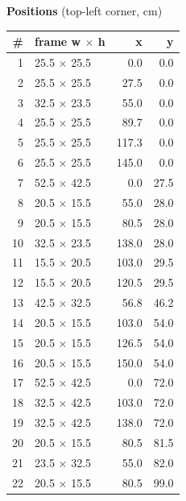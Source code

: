 \documentclass[a4paper,landscape,10pt]{article}
\begin{document}
\begin{minipage}[t]{0.25\textwidth}
\vspace{8pt}
{\bfseries Positions} (top-left corner, cm)\\[2pt]
\tiny
\begin{tabular}{@{}r l r r@{}}
\toprule
\# & frame w $\times$ h & x & y \\
\midrule
1 & 25.5 $\times$ 25.5 & 0.0 & 0.0 \\
2 & 25.5 $\times$ 25.5 & 27.5 & 0.0 \\
3 & 32.5 $\times$ 23.5 & 55.0 & 0.0 \\
4 & 25.5 $\times$ 25.5 & 89.7 & 0.0 \\
5 & 25.5 $\times$ 25.5 & 117.3 & 0.0 \\
6 & 25.5 $\times$ 25.5 & 145.0 & 0.0 \\
7 & 52.5 $\times$ 42.5 & 0.0 & 27.5 \\
8 & 20.5 $\times$ 15.5 & 55.0 & 28.0 \\
9 & 20.5 $\times$ 15.5 & 80.5 & 28.0 \\
10 & 32.5 $\times$ 23.5 & 138.0 & 28.0 \\
11 & 15.5 $\times$ 20.5 & 103.0 & 29.5 \\
12 & 15.5 $\times$ 20.5 & 120.5 & 29.5 \\
13 & 42.5 $\times$ 32.5 & 56.8 & 46.2 \\
14 & 20.5 $\times$ 15.5 & 103.0 & 54.0 \\
15 & 20.5 $\times$ 15.5 & 126.5 & 54.0 \\
16 & 20.5 $\times$ 15.5 & 150.0 & 54.0 \\
17 & 52.5 $\times$ 42.5 & 0.0 & 72.0 \\
18 & 32.5 $\times$ 42.5 & 103.0 & 72.0 \\
19 & 32.5 $\times$ 42.5 & 138.0 & 72.0 \\
20 & 20.5 $\times$ 15.5 & 80.5 & 81.5 \\
21 & 23.5 $\times$ 32.5 & 55.0 & 82.0 \\
22 & 20.5 $\times$ 15.5 & 80.5 & 99.0 \\
\bottomrule
\end{tabular}
\end{minipage}
\clearpage
\end{document}
